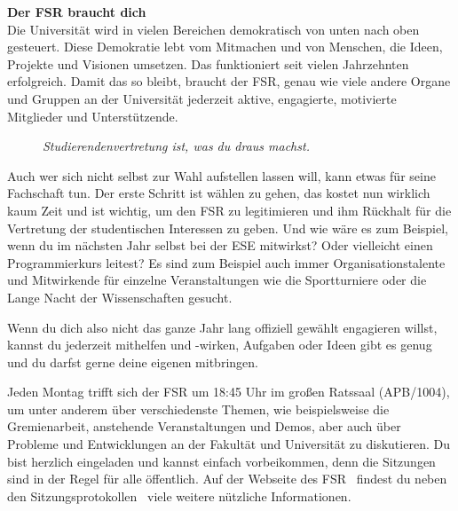 \textbf{Der FSR braucht dich} \\
Die Universität wird in vielen Bereichen demokratisch von unten nach oben gesteuert. Diese Demokratie lebt vom Mitmachen und von Menschen, die Ideen, Projekte und Visionen umsetzen.
Das funktioniert seit vielen Jahrzehnten erfolgreich.
Damit das so bleibt, braucht der FSR, genau wie viele andere Organe und Gruppen an der Universität jederzeit aktive, engagierte, motivierte Mitglieder und Unterstützende.

\begin{figure}[h!]
\centering
\textit{Studierendenvertretung ist, was du draus machst.}
\end{figure}

Auch wer sich nicht selbst zur Wahl aufstellen lassen will, kann etwas für seine Fachschaft tun.
Der erste Schritt ist wählen zu gehen, das kostet nun wirklich kaum Zeit und ist wichtig, um den FSR zu legitimieren und ihm Rückhalt für die Vertretung der studentischen Interessen zu geben.
Und wie wäre es zum Beispiel, wenn du im nächsten Jahr selbst bei der ESE mitwirkst? Oder vielleicht einen Programmierkurs leitest?
Es sind zum Beispiel auch immer Organisationstalente und Mitwirkende für einzelne Veranstaltungen wie die Sportturniere oder die Lange Nacht der Wissenschaften gesucht.

\pagebreak

Wenn du dich also nicht das ganze Jahr lang offiziell gewählt engagieren willst, kannst du jederzeit mithelfen und -wirken, Aufgaben oder Ideen gibt es genug und du darfst gerne deine eigenen mitbringen.

Jeden Montag trifft sich der FSR um 18:45 Uhr im großen Ratssaal (APB/1004), um unter anderem über verschiedenste Themen, wie beispielsweise die Gremienarbeit, anstehende Veranstaltungen und Demos, aber auch über Probleme und Entwicklungen an der Fakultät und Universität zu diskutieren.
Du bist herzlich eingeladen und kannst einfach vorbeikommen, denn die Sitzungen sind in der Regel für alle öffentlich. Auf der Webseite des FSR~ findest du neben den Sitzungsprotokollen~ viele weitere nützliche Informationen.


